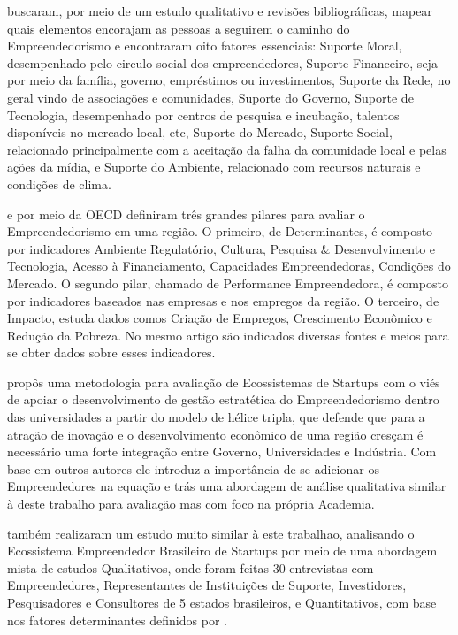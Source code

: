  buscaram, por meio de um estudo qualitativo e revisões bibliográficas, mapear quais elementos encorajam as pessoas a seguirem o caminho do Empreendedorismo e encontraram oito fatores essenciais: Suporte Moral, desempenhado pelo circulo social dos empreendedores, Suporte Financeiro, seja por meio da família, governo, empréstimos ou investimentos, Suporte da Rede, no geral vindo de associações e comunidades, Suporte do Governo, Suporte de Tecnologia, desempenhado por centros de pesquisa e incubação, talentos disponíveis no mercado local, etc, Suporte do Mercado, Suporte Social, relacionado principalmente com a aceitação da falha da comunidade local e pelas ações da mídia, e Suporte do Ambiente, relacionado com recursos naturais e condições de clima.

 e  por meio da OECD definiram três grandes pilares para avaliar o Empreendedorismo em uma região. O primeiro, de Determinantes, é composto por indicadores Ambiente Regulatório, Cultura, Pesquisa \& Desenvolvimento e Tecnologia, Acesso à Financiamento, Capacidades Empreendedoras, Condições do Mercado. O segundo pilar, chamado de Performance Empreendedora, é composto por indicadores baseados nas empresas e nos empregos da região. O terceiro, de Impacto, estuda dados comos Criação de Empregos, Crescimento Econômico e Redução da Pobreza. No mesmo artigo são indicados diversas fontes e meios para se obter dados sobre esses indicadores.

 propôs uma metodologia para avaliação de Ecossistemas de Startups com o viés de apoiar o desenvolvimento de gestão estratética do Empreendedorismo dentro das universidades a partir do modelo de hélice tripla, que defende que para a atração de inovação e o desenvolvimento econômico de uma região cresçam é necessário uma forte integração entre Governo, Universidades e Indústria. Com base em outros autores ele introduz a importância de se adicionar os Empreendedores na equação e trás uma abordagem de análise qualitativa similar à deste trabalho para avaliação mas com foco na própria Academia.

 também realizaram um estudo muito similar à este trabalhao, analisando o Ecossistema Empreendedor Brasileiro de Startups por meio de uma abordagem mista de estudos Qualitativos, onde foram feitas 30 entrevistas com Empreendedores, Representantes de Instituições de Suporte, Investidores, Pesquisadores e Consultores de 5 estados brasileiros, e Quantitativos, com base nos fatores determinantes definidos por . 

